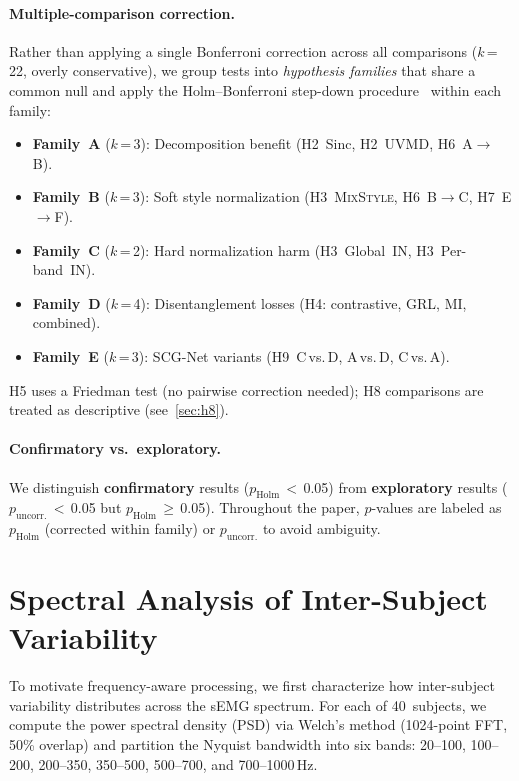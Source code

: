 \documentclass[conference]{IEEEtran}
\newcommand{\mixstyle}{\textsc{MixStyle}}
\newcommand{\uvmd}{\textsc{UVMD}}
\begin{document}
\paragraph{Multiple-comparison correction.}
Rather than applying a single Bonferroni correction across all comparisons ($k$\,=\,22, overly conservative), we group tests into \emph{hypothesis families} that share a common null and apply the Holm--Bonferroni step-down procedure~\cite{holm1979simple} within each family:
\begin{itemize}
    \item \textbf{Family~A} ($k$\,=\,3): Decomposition benefit (H2~Sinc, H2~\uvmd{}, H6~A$\to$B).
    \item \textbf{Family~B} ($k$\,=\,3): Soft style normalization (H3~\mixstyle{}, H6~B$\to$C, H7~E$\to$F).
    \item \textbf{Family~C} ($k$\,=\,2): Hard normalization harm (H3~Global~IN, H3~Per-band~IN).
    \item \textbf{Family~D} ($k$\,=\,4): Disentanglement losses (H4: contrastive, GRL, MI, combined).
    \item \textbf{Family~E} ($k$\,=\,3): SCG-Net variants (H9~C\,vs.\,D, A\,vs.\,D, C\,vs.\,A).
\end{itemize}
H5 uses a Friedman test (no pairwise correction needed); H8 comparisons are treated as descriptive (see~\cref{sec:h8}).

\paragraph{Confirmatory vs.\ exploratory.}
We distinguish \textbf{confirmatory} results ($p_{\mathrm{Holm}}$\,$<$\,0.05) from \textbf{exploratory} results ($p_{\mathrm{uncorr.}}$\,$<$\,0.05 but $p_{\mathrm{Holm}}$\,$\geq$\,0.05).
Throughout the paper, $p$-values are labeled as $p_{\mathrm{Holm}}$ (corrected within family) or $p_{\mathrm{uncorr.}}$ to avoid ambiguity.

\section{Spectral Analysis of Inter-Subject Variability}
\label{sec:h1}

To motivate frequency-aware processing, we first characterize how inter-subject variability distributes across the sEMG spectrum.
For each of 40~subjects, we compute the power spectral density (PSD) via Welch's method (1024-point FFT, 50\% overlap) and partition the Nyquist bandwidth into six bands: 20--100, 100--200, 200--350, 350--500, 500--700, and 700--1000\,Hz.
\end{document}
